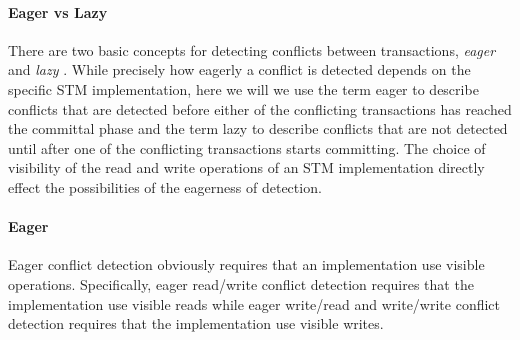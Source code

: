 
\paragraph{Eager vs Lazy}
There are two basic concepts for detecting conflicts between transactions, \emph{eager} and \emph{lazy} \cite{HLMS03}.
While precisely how eagerly a conflict is detected depends on the specific STM implementation, here we will
we use the term eager to describe conflicts that are detected before either of the conflicting transactions has
reached the committal phase and the term lazy to describe conflicts that are not detected until after one of
the conflicting transactions starts committing.
The choice of visibility of the read and write operations of an STM implementation directly effect the
possibilities of the eagerness of detection.

\paragraph{Eager}
Eager conflict detection obviously requires that an implementation use visible operations.
Specifically, eager read/write conflict detection requires that the implementation use 
visible reads while eager write/read and write/write conflict detection requires that the implementation 
use visible writes.

